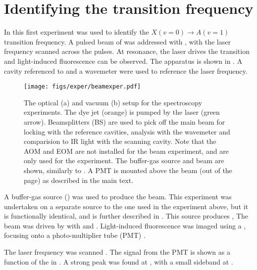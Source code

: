\section{Identifying the transition frequency}

In this first experiment  was used to identify the $X(v=0)
\rightarrow A(v=1)$ transition frequency. A pulsed beam of \CaF{} was addressed
with , with the laser frequency scanned across the pulses. At
resonance, the laser drives the transition and light-induced fluorescence can
be observed. The apparatus is shown in . A cavity
referenced to  and a wavemeter were used to reference
the laser frequency.

\begin{figure}
  \centering
  \texttt{[image: figs/exper/beamexper.pdf]}
  \caption{The optical (a) and vacuum (b) setup for the spectroscopy
    experiments. The dye jet (orange) is pumped by the  laser (green
    arrow). Beamsplitters (BS) are used to pick off the main beam for locking
    with the reference cavities, analysis with the wavemeter and comparision to
    IR light with the scanning cavity. Note that the AOM and EOM are not
    installed for the beam experiment, and are only used for the 
    experiment. The buffer-gas source and \CaF{} beam are shown, similarly to
    . A PMT is mounted above the beam (out of the
    page) as described in the main text.
  }
  \label{exper:fig:beamapp} 
\end{figure}

A buffer-gas source () was used to produce the \CaF{} beam.
This experiment was undertaken on a separate \CaF{} source to the one used in
the experiment above, but it is functionally identical, and is further
described in . This source produces ,  The beam was driven by  with  and
. Light-induced fluorescence was imaged using a , focusing onto a photo-multiplier tube (PMT) .

The laser frequency was scanned . The signal from the PMT is shown as a function of the  in . A strong peak was found at
, with a small sideband at  . 

